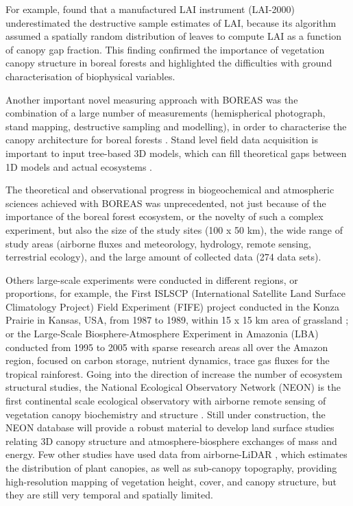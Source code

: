 For example, \citet{Chen1997} found that a manufactured LAI instrument (LAI-2000) underestimated the destructive sample estimates of LAI, because its algorithm assumed a spatially random distribution of leaves to compute LAI as a function of canopy gap fraction. This finding confirmed the importance of vegetation canopy structure in boreal forests and highlighted the difficulties with ground characterisation of biophysical variables. 

Another important novel measuring approach with BOREAS was the combination of a large number of measurements (hemispherical photograph, stand mapping, destructive sampling and modelling), in order to characterise the canopy architecture for boreal forests \citep{Fournier1997}. Stand level field data acquisition is important to input tree-based 3D models, which can fill theoretical gaps between 1D models and actual ecosystems \citep{Widlowski2011}.

The theoretical and observational progress in biogeochemical and atmospheric sciences achieved with BOREAS was unprecedented, not just because of the importance of the boreal forest ecosystem, or the novelty of such a complex experiment, but also the size of the study sites (100 x 50 km), the wide range of study areas (airborne fluxes and meteorology, hydrology, remote sensing, terrestrial ecology), and the large amount of collected data (274 data sets).

Others large-scale experiments were conducted in different regions, or proportions, for example, the First ISLSCP (International Satellite Land Surface Climatology Project) Field Experiment (FIFE) project conducted in the Konza Prairie in Kansas, USA, from 1987 to 1989, within 15 x 15 km area of grassland \citep{Hall1995}; or the Large-Scale Biosphere-Atmosphere Experiment in Amazonia (LBA) conducted from 1995 to 2005 with sparse research areas all over the Amazon region, focused on carbon storage, nutrient dynamics, trace gas fluxes for the tropical rainforest. 
Going into the direction of increase the number of ecosystem structural studies, the National Ecological Observatory Network (NEON) is the first continental scale ecological observatory with airborne remote sensing of vegetation canopy biochemistry and structure \citep{Kampe2010}. Still under construction, the NEON database will provide a robust material to develop land surface studies relating 3D canopy structure and atmosphere-biosphere exchanges of mass and energy. Few other studies have used data from airborne-LiDAR \citep{Chen2008,Kobayashi2012}, which estimates the distribution of plant canopies, as well as sub-canopy topography, providing high-resolution mapping of vegetation height, cover, and canopy structure, but they are still very temporal and spatially limited. 

